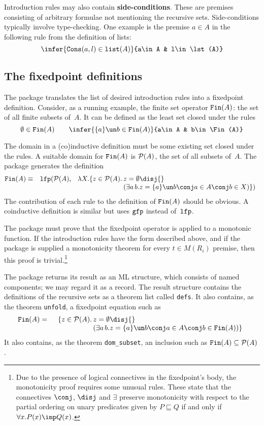 Introduction rules may also contain {\bf side-conditions}.  These are
premises consisting of arbitrary formulae not mentioning the recursive
sets. Side-conditions typically involve type-checking.  One example is the
premise $a\in A$ in the following rule from the definition of lists:
\[ \infer{\Cons(a,l)\in\lst(A)}{a\in A & l\in\lst(A)} \]

\subsection{The fixedpoint definitions}
The package translates the list of desired introduction rules into a fixedpoint
definition.  Consider, as a running example, the finite set operator
$\hbox{\tt Fin}(A)$: the set of all finite subsets of~$A$.  It can be
defined as the least set closed under the rules
\[  \emptyset\in\Fin(A)  \qquad 
    \infer{\{a\}\un b\in\Fin(A)}{a\in A & b\in\Fin(A)} 
\]

The domain in a (co)inductive definition must be some existing set closed
under the rules.  A suitable domain for $\hbox{\tt Fin}(A)$ is ${\cal P}(A)$, the set of all
subsets of~$A$.  The package generates the definition
\begin{eqnarray*}
  \Fin(A) & \equiv &  \lfp(\pow(A), \;
  \begin{array}[t]{r@{\,}l}
      \lambda X. \{z\in\pow(A). & z=\emptyset \disj{} \\
                  &(\exists a\,b. z=\{a\}\un b\conj a\in A\conj b\in X)\})
  \end{array}
\end{eqnarray*} 
The contribution of each rule to the definition of $\hbox{\tt Fin}(A)$ should be
obvious.  A coinductive definition is similar but uses $\hbox{\tt gfp}$ instead
of~$\hbox{\tt lfp}$.

The package must prove that the fixedpoint operator is applied to a
monotonic function.  If the introduction rules have the form described
above, and if the package is supplied a monotonicity theorem for every
$t\in M(R_i)$ premise, then this proof is trivial.\footnote{Due to the
  presence of logical connectives in the fixedpoint's body, the
  monotonicity proof requires some unusual rules.  These state that the
  connectives $\conj$, $\disj$ and $\exists$ preserve monotonicity with respect
  to the partial ordering on unary predicates given by $P\sqsubseteq Q$ if and
  only if $\forall x.P(x)\imp Q(x)$.}

The package returns its result as an ML structure, which consists of named
components; we may regard it as a record.  The result structure contains
the definitions of the recursive sets as a theorem list called {\tt defs}.
It also contains, as the theorem {\tt unfold}, a fixedpoint equation such
as
\begin{eqnarray*}
  \Fin(A) & = &
  \begin{array}[t]{r@{\,}l}
     \{z\in\pow(A). & z=\emptyset \disj{} \\
             &(\exists a\,b. z=\{a\}\un b\conj a\in A\conj b\in \Fin(A))\}
  \end{array}
\end{eqnarray*}
It also contains, as the theorem {\tt dom\_subset}, an inclusion such as 
$\hbox{\tt Fin}(A)\subseteq{\cal P}(A)$.


